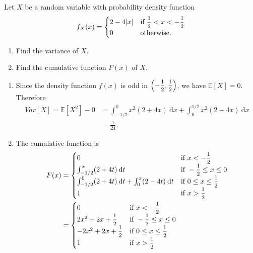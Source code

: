 \begin{example}
    Let $X$ be a random variable with probability density function
    \[
        f_X(x) = \begin{cases}
            2 - 4|x| & \text{if } \mfrac{1}{2} < x < -\mfrac{1}{2}\\
            0 & \text{otherwise}.
        \end{cases}
    \]
    \begin{enumerate}
        \item Find the variance of $X$.
        \item Find the cumulative function $F(x)$ of $X$.
    \end{enumerate}
\end{example}
\begin{solution}
    \begin{enumerate}
        \item Since the density function $f(x)$ is odd in $\left( -\mfrac{1}{2}, \mfrac{1}{2} \right)$, we have 
            $\mathbb{E}[X] = 0$. Therefore
            \begin{align*}
                Var[X] = \mathbb{E}[X^2] - 0 &= \int_{-1/2}^{0} x^2(2 + 4x)\> \mathrm{d}x +
                    \int_{0}^{1/2} x^2(2 - 4x)\> \mathrm{d}x\\
                    &= \frac{1}{24}.
            \end{align*}

        \item The cumulative function is
        \begin{align*}
            F(x) &= \begin{cases}
                0 & \text{if } x < -\mfrac{1}{2}\\
                \int_{-1/2}^{x} (2+4t)\> \mathrm{d}t & \text{if } -\mfrac{1}{2} \leq x \leq 0\\
                \int_{-1/2}^{0} (2+4t)\> \mathrm{d}t + \int_{0}^{x} (2-4t)\> \mathrm{d}t & \text{if } 0 \leq x \leq \mfrac{1}{2}\\
                1 & \text{if } x > \mfrac{1}{2}\\
            \end{cases}\\
            &= \begin{cases}
                0 & \text{if } x < -\mfrac{1}{2}\\
                2x^2 + 2x + \mfrac{1}{2} & \text{if } -\mfrac{1}{2} \leq x \leq 0\\
                -2x^2 + 2x + \mfrac{1}{2} & \text{if } 0 \leq x \leq \mfrac{1}{2}\\
                1 & \text{if } x > \mfrac{1}{2}\\
            \end{cases}
        \end{align*}
    \end{enumerate}
\end{solution}

